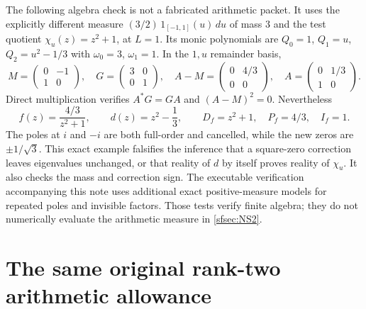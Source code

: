The following algebra check is not a fabricated arithmetic
packet. It uses the explicitly different measure
$(3/2)\,1_{[-1,1]}(u)\,du$ of mass $3$ and the test quotient
$\chi_u(z)=z^2+1$, at $L=1$. Its monic polynomials are
$Q_0=1$, $Q_1=u$, $Q_2=u^2-1/3$ with
$\omega_0=3$, $\omega_1=1$. In the $1,u$ remainder basis,
\begin{equation}\tag{NS33}\label{sfsec:NS33}
M=\begin{pmatrix}0&-1\\1&0\end{pmatrix},\quad
G=\begin{pmatrix}3&0\\0&1\end{pmatrix},\quad
A-M=\begin{pmatrix}0&4/3\\0&0\end{pmatrix},\quad
A=\begin{pmatrix}0&1/3\\1&0\end{pmatrix}.
\end{equation}
Direct multiplication verifies $A^*G=GA$ and
$(A-M)^2=0$. Nevertheless
\begin{equation}\tag{NS34}\label{sfsec:NS34}
f(z)=\frac{4/3}{z^2+1},\qquad
d(z)=z^2-\frac13,\qquad
D_f=z^2+1,\quad P_f=4/3,\quad I_f=1.
\end{equation}
The poles at $i$ and $-i$ are both full-order and
cancelled, while the new zeros are $\pm1/\sqrt3$.
This exact example falsifies the inference that a
square-zero correction leaves eigenvalues unchanged,
or that reality of $d$ by itself proves reality of
$\chi_u$. It also checks the mass and correction sign.
The executable verification accompanying this note
uses additional exact positive-measure models for
repeated poles and invisible factors. Those tests
verify finite algebra; they do not numerically
evaluate the arithmetic measure in \eqref{sfsec:NS2}.

\section{The same original rank-two arithmetic allowance}

